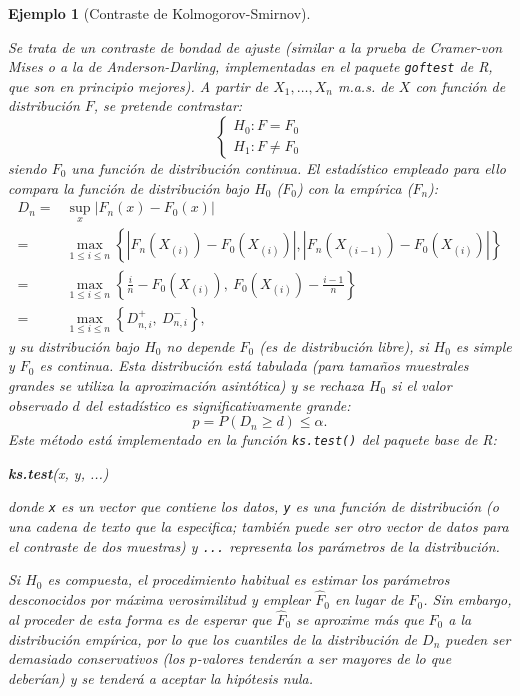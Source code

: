 \documentclass[
]{book}
\newenvironment{Shaded}{\begin{snugshade}}{\end{snugshade}}
\newcommand{\FunctionTok}[1]{\textcolor[rgb]{0.13,0.29,0.53}{\textbf{#1}}}
\newcommand{\NormalTok}[1]{#1}
\theoremstyle{break}
\newtheorem{example}{Ejemplo}[chapter]
\theoremstyle{nonumberplain}
\begin{document}
\begin{example}[Contraste de Kolmogorov-Smirnov]
\protect\hypertarget{exm:ks-test-sim-exp}{}\label{exm:ks-test-sim-exp}

Se trata de un contraste de bondad de ajuste (similar a la prueba de
Cramer-von Mises o a la de Anderson-Darling, implementadas en el paquete
\texttt{goftest} de R, que son en principio mejores).
A partir de \(X_1,\ldots ,X_n\) m.a.s. de \(X\) con función de distribución \(F\),
se pretende contrastar:
\[\left \{ 
\begin{array}{l}
H_0 : F = F_0 \\ 
H_1 : F \neq F_0 
\end{array}
\right. \]
siendo \(F_0\) una función de distribución continua.
El estadístico empleado para ello compara la función de distribución bajo
\(H_0\) (\(F_0\)) con la empírica (\(F_n\)):
\[\begin{aligned}
    D_n=&\sup_{x}|F_n(x)-F_0(x)| \\
    =&\max_{1 \leq i\leq n}\left \{
    |F_n(X_{(i)})-F_0(X_{(i)})|,|F_n(X_{(i-1)})-F_0(X_{(i)})|\right \} \\
    =&\max_{1 \leq i\leq n}\left \{ \frac{i}{n}-F_0(X_{(i)}), \ F_0(X_{(i)})-\frac{i-1}{n}\right \} \\
    =&\max_{1 \leq i\leq n}\left \{ D_{n,i}^{+},\ D_{n,i}^{-}\right \},
\end{aligned}\]
y su distribución bajo \(H_0\) no depende \(F_0\) (es de distribución libre),
si \(H_0\) es simple y \(F_0\) es continua.
Esta distribución está tabulada (para tamaños muestrales grandes se utiliza
la aproximación asintótica) y se rechaza \(H_0\) si el valor observado \(d\)
del estadístico es significativamente grande:
\[p = P \left( D_n \geq d \right) \leq \alpha.\]
Este método está implementado en la función \texttt{ks.test()} del paquete base de R:

\begin{Shaded}
\begin{Highlighting}[]
\FunctionTok{ks.test}\NormalTok{(x, y, ...)}
\end{Highlighting}
\end{Shaded}

donde \texttt{x} es un vector que contiene los datos, \texttt{y} es una función de distribución
(o una cadena de texto que la especifica; también puede ser otro vector de datos
para el contraste de dos muestras) y \texttt{...} representa los parámetros de la distribución.

Si \(H_0\) es compuesta, el procedimiento habitual es estimar los parámetros desconocidos
por máxima verosimilitud y emplear \(\hat{F}_0\) en lugar de \(F_0\).
Sin embargo, al proceder de esta forma es de esperar que \(\hat{F}_0\) se aproxime más
que \(F_0\) a la distribución empírica, por lo que los cuantiles de la distribución de
\(D_n\) pueden ser demasiado conservativos (los \(p\)-valores tenderán a ser mayores de
lo que deberían) y se tenderá a aceptar la hipótesis nula.


\end{example}
\end{document}
